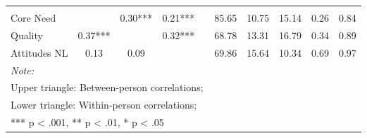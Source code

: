 \begin{table}
\begin{minipage}[t][\textheight][t]{\textwidth}
{\begin{tabular}[t]{lccccccccc}
\addlinespace[0.3em]
\multicolumn{10}{l}{\textbf{Across Studies}}\\
\hspace{1em}Core Need &  & 0.30*** & 0.21*** &  & 85.65 & 10.75 & 15.14 & 0.26 & 0.84\\
\hspace{1em}Quality & 0.37*** &  & 0.32*** &  & 68.78 & 13.31 & 16.79 & 0.34 & 0.89\\
\hspace{1em}Attitudes NL & 0.13 & 0.09 &  &  & 69.86 & 15.64 & 10.34 & 0.69 & 0.97\\
\bottomrule
\multicolumn{10}{l}{\rule{0pt}{1em}\textit{Note: }}\\
\multicolumn{10}{l}{\rule{0pt}{1em}Upper triangle: Between-person correlations;}\\
\multicolumn{10}{l}{\rule{0pt}{1em}Lower triangle: Within-person correlations;}\\
\multicolumn{10}{l}{\rule{0pt}{1em}*** p < .001, ** p < .01,  * p < .05}\\
\end{tabular}}
\end{minipage}
\end{table}
